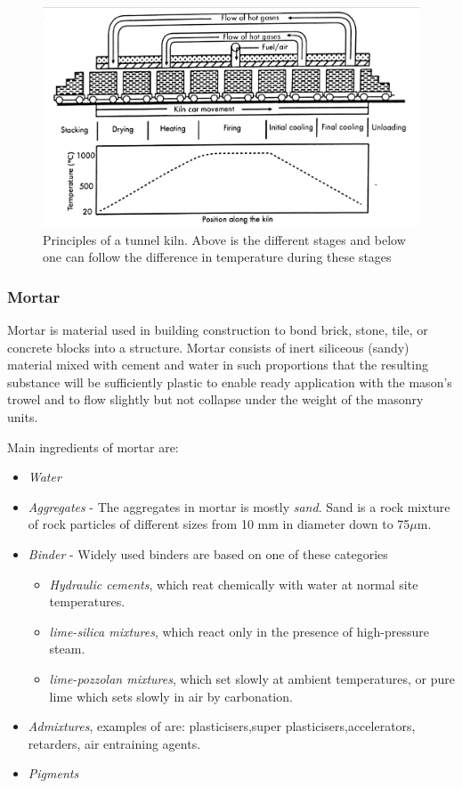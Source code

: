 \begin{figure}[H]
\centering
\includegraphics[width=0.9\linewidth ]{figure/Introduction/kiln2.pdf}
\caption{Principles of a tunnel kiln. Above is the different stages and below one can follow the difference in temperature during these stages \cite{ref:ConstructionMaterials}}
\end{figure}


\subsubsection{Mortar}

Mortar is  material used in building construction to bond brick, stone, tile, or concrete blocks into a structure. Mortar consists of inert siliceous (sandy) material mixed with cement and water in such proportions that the resulting substance will be sufficiently plastic to enable ready application with the mason’s trowel and to flow slightly but not collapse under the weight of the masonry units.\cite{ref:mortar}

Main ingredients of mortar are:
\begin{itemize}
\item \textit{Water}
\item \textit{Aggregates} - The aggregates in mortar is mostly \textit{sand}. Sand is a rock mixture of rock particles of different sizes from 10 mm in diameter down to 75$\mu$m. 
\item \textit{Binder} - Widely used binders are based on one of these categories
    \begin{itemize}
    \item \textit{Hydraulic cements}, which reat chemically with water at normal site temperatures.
    \item \textit{lime-silica mixtures}, which react only in the presence of high-pressure steam.
    \item \textit{lime-pozzolan mixtures}, which set slowly at ambient temperatures, or pure lime which sets slowly in air by carbonation.
    \end{itemize}
\item \textit{Admixtures}, examples of are: plasticisers,super plasticisers,accelerators, retarders, air entraining agents. 
\item \textit{Pigments}
\end{itemize}





